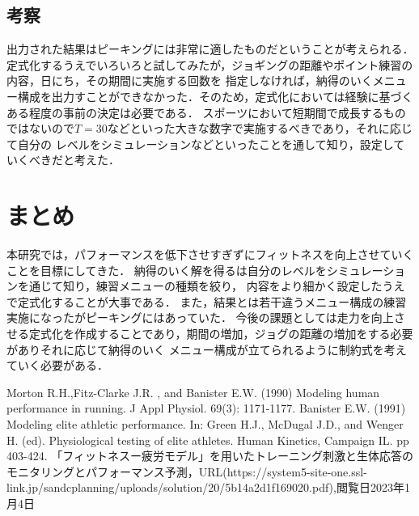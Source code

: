 \documentclass[12pt]{jarticle}
\begin{document}
\subsection{考察}
出力された結果はピーキングには非常に適したものだということが考えられる．
定式化するうえでいろいろと試してみたが，ジョギングの距離やポイント練習の内容，日にち，その期間に実施する回数を
指定しなければ，納得のいくメニュー構成を出力すことができなかった．そのため，定式化においては経験に基づくある程度の事前の決定は必要である．
スポーツにおいて短期間で成長するものではないので$T=30$などといった大きな数字で実施するべきであり，それに応じて自分の
レベルをシミュレーションなどといったことを通して知り，設定していくべきだと考えた．
\section{まとめ}
本研究では，パフォーマンスを低下させすぎずにフィットネスを向上させていくことを目標にしてきた．
納得のいく解を得るは自分のレベルをシミュレーションを通じて知り，練習メニューの種類を絞り，
内容をより細かく設定したうえで定式化することが大事である．
また，結果とは若干違うメニュー構成の練習実施になったがピーキングにはあっていた．
今後の課題としては走力を向上させる定式化を作成することであり，期間の増加，ジョグの距離の増加をする必要がありそれに応じて納得のいく
メニュー構成が立てられるように制約式を考えていく必要がある．
\begin{thebibliography}{99}
  Morton R.H.,Fitz-Clarke J.R. , and Banister E.W. (1990) Modeling human performance in running. J Appl Physiol. 69(3): 1171-1177.
  Banister E.W. (1991) Modeling elite athletic performance. In: Green H.J., McDugal J.D., and Wenger H. (ed). Physiological testing of elite athletes. Human Kinetics, Campaign IL. pp 403-424.
  「フィットネスー疲労モデル」を用いたトレーニング刺激と生体応答のモニタリングとパフォーマンス予測，URL(https://system5-site-one.ssl-link.jp/sandcplanning/uploads/solution/20/5b14a2d1f169020.pdf),閲覧日2023年1月4日
\end{thebibliography}
\end{document}
